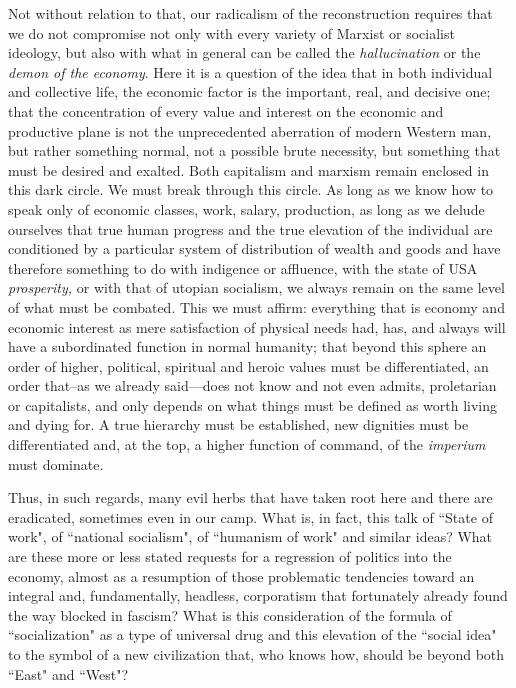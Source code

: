 Not without relation to that, our radicalism of the reconstruction requires that we do not compromise not only with every variety of Marxist or socialist ideology, but also with what in general can be called the \emph{hallucination} or the \emph{demon of the economy}. Here it is a question of the idea that in both individual and collective life, the economic factor is the important, real, and decisive one; that the concentration of every value and interest on the economic and productive plane is not the unprecedented aberration of modern Western man, but rather something normal, not a possible brute necessity, but something that must be desired and exalted. Both capitalism and marxism remain enclosed in this dark circle. We must break through this circle. As long as we know how to speak only of economic classes, work, salary, production, as long as we delude ourselves that true human progress and the true elevation of the individual are conditioned by a particular system of distribution of wealth and goods and have therefore something to do with indigence or affluence, with the state of USA \emph{prosperity,} or with that of utopian socialism, we always remain on the same level of what must be combated. This we must affirm: everything that is economy and economic interest as mere satisfaction of physical needs had, has, and always will have a subordinated function in normal humanity; that beyond this sphere an order of higher, political, spiritual and heroic values must be differentiated, an order that–as we already said—does not know and not even admits, proletarian or capitalists, and only depends on what things must be defined as worth living and dying for. A true hierarchy must be established, new dignities must be differentiated and, at the top, a higher function of command, of the \emph{imperium} must dominate.

Thus, in such regards, many evil herbs that have taken root here and there are eradicated, sometimes even in our camp. What is, in fact, this talk of ``State of work", of ``national socialism", of ``humanism of work" and similar ideas? What are these more or less stated requests for a regression of politics into the economy, almost as a resumption of those problematic tendencies toward an integral and, fundamentally, headless, corporatism that fortunately already found the way blocked in fascism? What is this consideration of the formula of ``socialization" as a type of universal drug and this elevation of the ``social idea" to the symbol of a new civilization that, who knows how, should be beyond both ``East" and ``West"?


